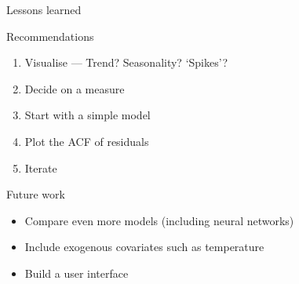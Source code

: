\documentclass[12pt,aspectratio=169]{beamer}
\begin{document}
\begin{frame}{Lessons learned}
\end{frame}

\begin{frame}{Recommendations}
    \begin{enumerate}[<+->]
        \setlength{\itemsep}{1em}
        \item \alert<1>{Visualise} --- Trend? Seasonality? `Spikes'?
        \item Decide on a \alert<2>{measure}
        \item Start with a \alert<3>{simple} model
        \item \alert<4>{Plot the ACF of residuals}
        \item \alert<5>{Iterate}
    \end{enumerate}
\end{frame}

\begin{frame}{Future work}
    \begin{itemize}
        \setlength{\itemsep}{1em}
        \item Compare even more models (including neural networks)
        \item Include exogenous covariates such as temperature
        \item Build a user interface
    \end{itemize}
\end{frame}
\end{document}
